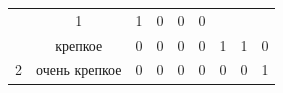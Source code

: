 \begin{table}[H]
\begin{center}
\begin{tabular}{|c|c|ccccccc|}
		& \multicolumn{1}{c|}{1}    
		 & \multicolumn{1}{c|}{1}      
		 & \multicolumn{1}{c|}{0}      
		 & \multicolumn{1}{c|}{0}       
		  & \multicolumn{1}{c|}{0}                       \\ \cline{2-9}
		{\color[HTML]{333333} }                                                    & крепкое                              
		& \multicolumn{1}{c|}{{\color[HTML]{333333} 0}} 
		& \multicolumn{1}{c|}{{\color[HTML]{333333} 0}} 
		& \multicolumn{1}{c|}{0}     
		& \multicolumn{1}{c|}{0}      
		& \multicolumn{1}{c|}{1}      
		& \multicolumn{1}{c|}{1}        
		& \multicolumn{1}{c|}{0}                       \\ \cline{2-9}
		\multirow{-6}{*}{{\color[HTML]{333333} 2}}                                 & очень крепкое                        
		& \multicolumn{1}{c|}{{\color[HTML]{333333} 0}} 
		& \multicolumn{1}{c|}{{\color[HTML]{333333} 0}} 
		& \multicolumn{1}{c|}{0}     
		& \multicolumn{1}{c|}{0}      
		& \multicolumn{1}{c|}{0}      
		& \multicolumn{1}{c|}{0}        
		& \multicolumn{1}{c|}{1}                       \\ \cline{1-9}
		

\end{tabular}
\end{center}
\end{table}
